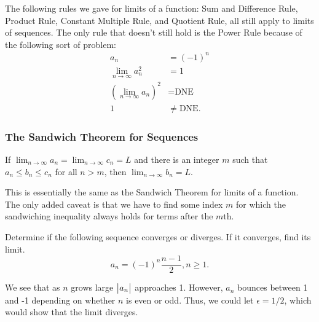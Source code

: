 The following rules we gave for limits of a function: Sum and Difference Rule, Product Rule, Constant Multiple Rule, and Quotient Rule, all still apply to limits of sequences.
The only rule that doesn't still hold is the Power Rule because of the following sort of problem:
\begin{align*}
	a_n &= (-1)^n \\
	\lim_{n\to\infty}{a_n^2} &= 1 \\
	\left(\lim_{n\to\infty}{a_n}\right)^2 &= \text{DNE} \\
	1 &\neq \text{DNE}.
\end{align*}

\subsubsection{The Sandwich Theorem for Sequences}
\begin{theorem}
	If $\lim_{n\to\infty}{a_n} = \lim_{n\to\infty}{c_n} = L$ and there is an integer $m$ such that $a_n \leq b_n \leq c_n$ for all $n > m$, then $\lim_{n\to\infty}{b_n} = L$.
\end{theorem}

This is essentially the same as the Sandwich Theorem for limits of a function.
The only added caveat is that we have to find some index $m$ for which the sandwiching inequality always holds for terms after the $m$th.

\begin{example}
	Determine if the following sequence converges or diverges.
	If it converges, find its limit.
	\begin{equation*}
		a_n = (-1)^n\frac{n-1}{2}, n\geq 1.
	\end{equation*}
\end{example}
\begin{answer}
	We see that as $n$ grows large $\big\lvert a_n \big\rvert$ approaches 1.
	However, $a_n$ bounces between 1 and -1 depending on whether $n$ is even or odd.
	Thus, we could let $\epsilon = 1/2$, which would show that the limit diverges.
\end{answer}

